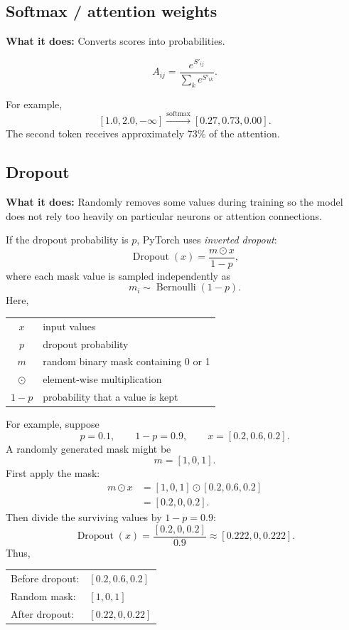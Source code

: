 \subsection{Softmax / attention weights}

\textbf{What it does:} Converts scores into probabilities.

\[
  A_{ij}=\frac{e^{S'_{ij}}}{\sum_k e^{S'_{ik}}}.
\]

For example,
\[
  [1.0,2.0,-\infty]
  \xrightarrow{\operatorname{softmax}}
  [0.27,0.73,0.00].
\]
The second token receives approximately 73\% of the attention.

\subsection{Dropout}

\textbf{What it does:} Randomly removes some values during training so the
model does not rely too heavily on particular neurons or attention
connections.

If the dropout probability is \(p\), PyTorch uses \emph{inverted dropout}:
\[
  \operatorname{Dropout}(x)=\frac{m\odot x}{1-p},
\]
where each mask value is sampled independently as
\[
  m_i\sim\operatorname{Bernoulli}(1-p).
\]
Here,
\begin{center}
\begin{tabular}{@{}cl@{}}
  \(x\) & input values \\
  \(p\) & dropout probability \\
  \(m\) & random binary mask containing 0 or 1 \\
  \(\odot\) & element-wise multiplication \\
  \(1-p\) & probability that a value is kept
\end{tabular}
\end{center}

For example, suppose
\[
  p=0.1,
  \qquad
  1-p=0.9,
  \qquad
  x=[0.2,0.6,0.2].
\]
A randomly generated mask might be
\[
  m=[1,0,1].
\]
First apply the mask:
\begin{align*}
  m\odot x
  &=[1,0,1]\odot[0.2,0.6,0.2]\\
  &=[0.2,0,0.2].
\end{align*}
Then divide the surviving values by \(1-p=0.9\):
\[
  \operatorname{Dropout}(x)
  =\frac{[0.2,0,0.2]}{0.9}
  \approx[0.222,0,0.222].
\]
Thus,
\begin{center}
\begin{tabular}{@{}ll@{}}
  Before dropout: & \([0.2,0.6,0.2]\) \\
  Random mask:    & \([1,0,1]\) \\
  After dropout:  & \([0.22,0,0.22]\)
\end{tabular}
\end{center}

